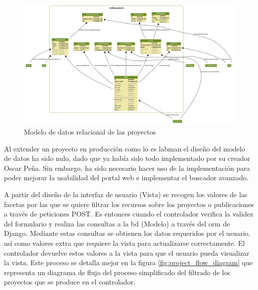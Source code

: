 \begin{figure}[!htbp]
	\centering
	\includegraphics[angle=90, scale=0.35]{fig/dbmodel/projects}
	\caption{Modelo de datos relacional de las proyectos}
	\label{fig:projectsmodel}
\end{figure}

Al extender un proyecto en producción como lo es \acrshort{labman} el diseño del modelo de datos ha sido nulo, dado que ya había sido todo implementado por su creador Oscar Peña. Sin embargo, ha sido necesario hacer uso de la implementación para poder mejorar la usabilidad del portal web e implementar el buscador avanzado.

A partir del diseño de la interfaz de usuario (Vista) se recogen los valores de las facetas por las que se quiere filtrar los recursos sobre los proyectos o publicaciones a través de peticiones POST. Es entonces cuando el controlador verifica la validez del formulario y realiza las consultas a la \acrshort{bd} (Modelo) a través del \acrshort{orm} de Django. Mediante estas consultas se obtienen los datos requeridos por el usuario, así como valores extra que requiere la vista para actualizarse correctamente. El controlador devuelve estos valores a la vista para que el usuario pueda visualizar la vista. Este proceso se detalla mejor en la figura \ref{fig:project_flow_diagram} que representa un diagrama de flujo del proceso simplificado del filtrado de los proyectos que se produce en el controlador.

